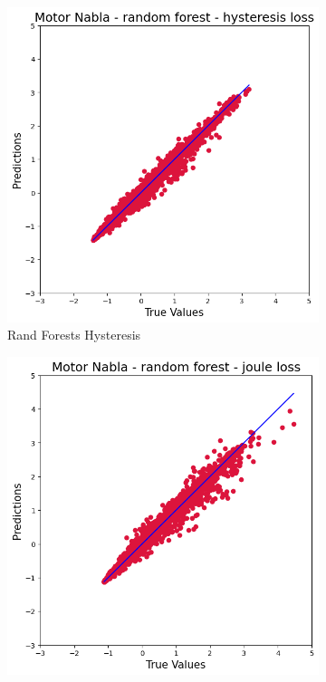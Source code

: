 \documentclass{article}
\begin{document}
\begin{figure}[!htbp]
    \begin{subfigure}[b]{0.23\textwidth}
        \centering
        \includegraphics[width=\textwidth]{images/Nabla/rand_for_hysteresis.png}
        \caption{Rand Forests Hysteresis}
    \end{subfigure}
    \hfill
    \begin{subfigure}[b]{0.23\textwidth}
        \centering
        \includegraphics[width=\textwidth]{images/Nabla/rand_for_joule.png}

\end{subfigure}
\end{figure}
\end{document}
